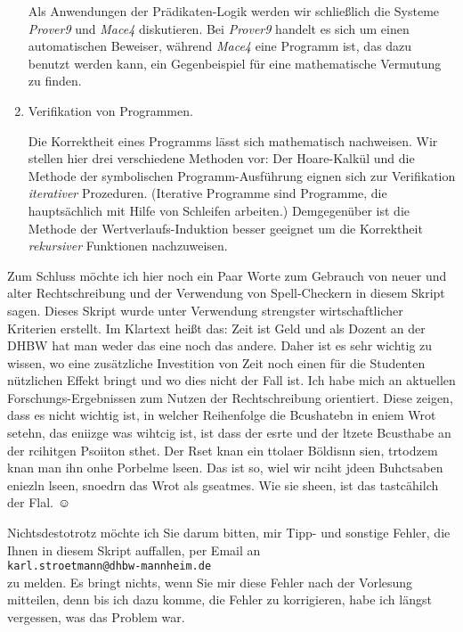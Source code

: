 \begin{enumerate}
      Als Anwendungen der Prädikaten-Logik werden wir schließlich die Systeme \textsl{Prover9} und
      \textsl{Mace4} diskutieren.  Bei \textsl{Prover9} handelt es sich um einen automatischen
      Beweiser, während \textsl{Mace4} eine Programm ist, das dazu benutzt werden kann, ein
      Gegenbeispiel für eine mathematische Vermutung zu finden.

\item Verifikation von Programmen.

      Die Korrektheit eines Programms lässt sich mathematisch nachweisen.  Wir stellen hier drei
      verschiedene Methoden vor: Der Hoare-Kalkül und die Methode der symbolischen
      Programm-Ausführung eignen sich zur Verifikation \emph{iterativer} Prozeduren.  (Iterative
      Programme sind Programme, die hauptsächlich mit Hilfe von Schleifen arbeiten.)
      Demgegenüber ist die Methode der Wertverlaufs-Induktion besser geeignet um die Korrektheit
      \emph{rekursiver} Funktionen nachzuweisen.
\end{enumerate}
\pagebreak

\remark
Zum Schluss möchte ich hier noch ein Paar Worte zum Gebrauch von neuer und alter
Rechtschreibung und der Verwendung von Spell-Checkern in diesem Skript sagen.
Dieses Skript wurde unter Verwendung strengster wirtschaftlicher Kriterien
erstellt.  Im Klartext heißt das: Zeit ist Geld und als Dozent an der DHBW hat man
weder das eine noch das andere.  Daher ist es sehr wichtig zu wissen, wo eine
zusätzliche Investition von Zeit noch einen für die Studenten nützlichen Effekt
bringt und wo dies nicht der Fall ist.  Ich habe mich an aktuellen
Forschungs-Ergebnissen zum Nutzen der Rechtschreibung orientiert. Diese zeigen,
dass es nicht wichtig ist, in welcher Reihenfolge die Bcushatebn in eniem Wrot
setehn, das eniizge was wihtcig ist, ist dass der esrte und der ltzete Bcusthabe
an der rcihitgen Psoiiton sthet. Der Rset knan ein ttolaer Böldisnn sien,
trtodzem knan man ihn onhe Porbelme lseen. Das ist so, wiel wir nciht jdeen
Buhctsaben eniezln lseen, snoedrn das Wrot als gseatmes.  Wie sie sheen, ist das
tastcähilch der Flal. $\displaystyle\smiley$

Nichtsdestotrotz möchte ich Sie darum bitten, mir Tipp- und sonstige Fehler, die Ihnen in diesem
Skript auffallen, per Email an
\\[0.2cm]
\hspace*{1.3cm}
\texttt{karl.stroetmann@dhbw-mannheim.de}
\\[0.2cm]
zu melden.  Es bringt nichts, wenn Sie mir diese Fehler nach der
Vorlesung mitteilen, denn bis ich dazu komme, die Fehler zu korrigieren, habe ich längst vergessen,
was das Problem war.

